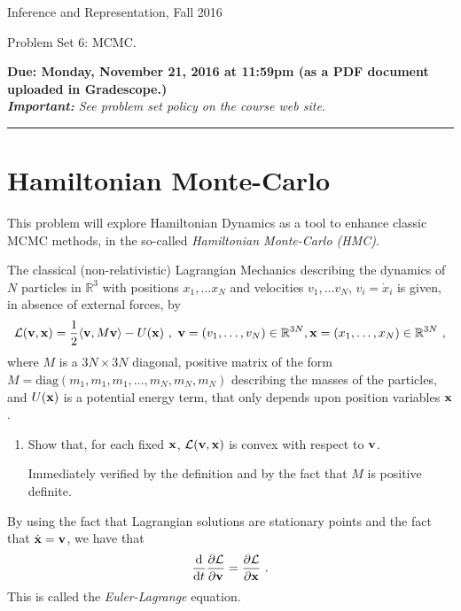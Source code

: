 \documentclass{article}
\newcommand{\ruleskip}{\bigskip\hrule\bigskip}
\newcommand{\R}{\mathbb{R}}
\newcommand{\xx}{{\bf x}}
\newcommand{\vv}{{\bf v}}
\begin{document}
\pagestyle{myheadings} 

{\LARGE
\begin{center}Inference and Representation, Fall 2016\end{center}
}

{\Large
Problem Set 6: MCMC.
}


{\bf Due: Monday, November 21, 2016 at 11:59pm (as a PDF document uploaded in
  Gradescope.)}\\

{\em {\bf Important:} See problem set policy on the course web site.}
\ruleskip



\section*{Hamiltonian Monte-Carlo} 
This problem will explore Hamiltonian Dynamics as a tool 
to enhance classic MCMC methods, in the so-called \emph{Hamiltonian Monte-Carlo (HMC)}. 

The classical (non-relativistic) Lagrangian Mechanics describing the dynamics of $N$ particles in $\R^3$ with positions $x_1, \dots x_N$ and velocities $v_1, \dots v_N$, $v_i = \dot{x}_i$ is given, in absence of external forces, by 
\begin{equation}
\mathcal{L}(\vv, \xx) = \frac{1}{2} \langle \vv, M \vv \rangle - U(\xx)~,~\vv=(v_1, \dots, v_N) \in \R^{3N}, \xx=(x_1, \dots, x_N) \in \R^{3N}~,
\end{equation} 
where $M$ is a $3N \times 3N$ diagonal, positive matrix of the form $M = \text{diag}(m_1, m_1, m_1, \dots, m_N, m_N, m_N)$ describing
the masses of the particles, and $U(\xx)$ is a potential energy term, that only depends upon position variables $\xx$.
\begin{enumerate}
\item Show that, for each fixed $\xx$, $\mathcal{L}(\vv, \xx)$ is convex with respect to $\vv$. 

{\color{blue} 
Immediately verified by the definition and by the fact that $M$ is positive definite. 
}
\end{enumerate}
By using the fact that Lagrangian solutions are stationary points and the fact that 
$\dot{\xx} = \vv$, we have that
\begin{equation}
\frac{\mathrm{d}}{\mathrm{d}t} \frac{\partial \mathcal{L}}{\partial \vv} = \frac{\partial \mathcal{L}}{\partial \xx}~.
\end{equation}
This is called the \emph{Euler-Lagrange} equation.
\end{document}
